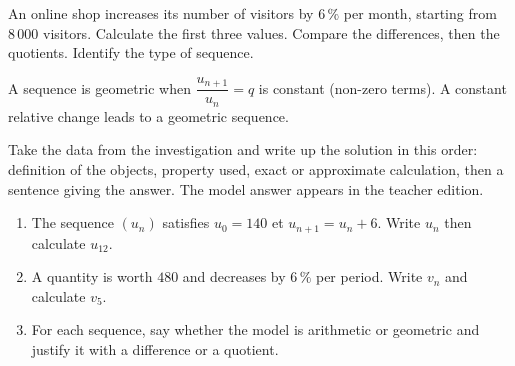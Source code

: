     \begin{activite}
    An online shop increases its number of visitors by $6\,\%$ per month, starting from $8\,000$ visitors. Calculate the first three values. Compare the differences, then the quotients. Identify the type of sequence.
    \begin{center}\end{center}
    \end{activite}

    \begin{traceecrite}A sequence is geometric when $\dfrac{u_{n+1}}{u_n}=q$ is constant (non-zero terms). A constant relative change leads to a geometric sequence.\end{traceecrite}

    \begin{exemple}
    Take the data from the investigation and write up the solution in this order: definition of the objects, property used, exact or approximate calculation, then a sentence giving the answer. The model answer appears in the teacher edition.
    \end{exemple}

    \begin{exercice}[-- essential]
    \begin{enumerate}\item The sequence $(u_n)$ satisfies $u_0=140$ et $u_{n+1}=u_n+6$. Write $u_n$ then calculate $u_{12}$.\item A quantity is worth $480$ and decreases by $6\,\%$ per period. Write $v_n$ and calculate $v_5$.\item For each sequence, say whether the model is arithmetic or geometric and justify it with a difference or a quotient.\end{enumerate}
    \end{exercice}

